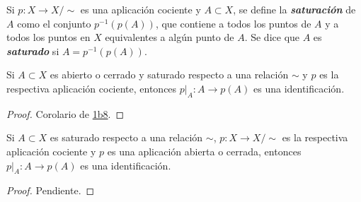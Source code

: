 

\begin{definition}
Si $p : X \longrightarrow X/\sim$ es una aplicación cociente y $A \subset X$, se define la \emph{\textbf{saturación}} de $A$ como el conjunto $p^{-1}(p(A))$, que contiene a todos los puntos de $A$ y a todos los puntos en $X$ equivalentes a algún punto de $A$. Se dice que $A$ es \emph{\textbf{saturado}} si $A = p^{-1}(p(A))$.
\end{definition}

\begin{proposition}
Si $A \subset X$ es abierto o cerrado y saturado respecto a una relación $\sim$ y $p$ es la respectiva aplicación cociente, entonces $p|_A : A \longrightarrow p(A)$ es una identificación.
\end{proposition}

\begin{proof}
Corolario de \hyperref[card:1b8]{\textsf{1b8}}.
\end{proof}

\begin{proposition}
Si $A \subset X$ es saturado respecto a una relación $\sim$, $p : X \longrightarrow X/\sim$ es la respectiva aplicación cociente y $p$ es una aplicación abierta o cerrada, entonces $p|_A : A \longrightarrow p(A)$ es una identificación.
\end{proposition}

\begin{proof}
Pendiente.
\end{proof}
